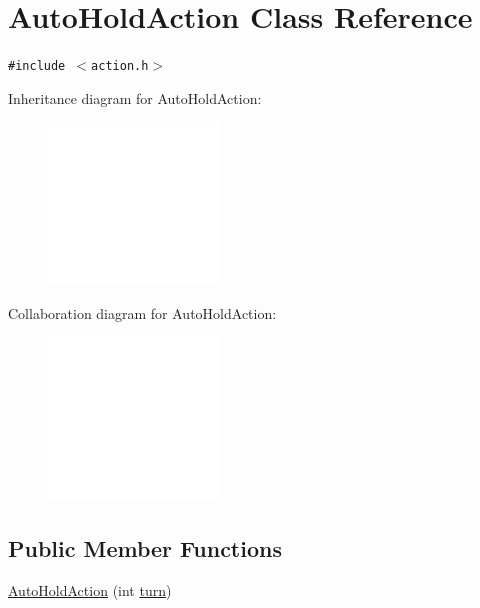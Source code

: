 \hypertarget{classAutoHoldAction}{
\section{AutoHoldAction Class Reference}
\label{classAutoHoldAction}
}
{\tt \#include $<$action.h$>$}

Inheritance diagram for AutoHoldAction:\nopagebreak
\begin{figure}[H]
\begin{center}
\leavevmode
\includegraphics[width=130pt]{classAutoHoldAction__inherit__graph}
\end{center}
\end{figure}
Collaboration diagram for AutoHoldAction:\nopagebreak
\begin{figure}[H]
\begin{center}
\leavevmode
\includegraphics[width=130pt]{classAutoHoldAction__coll__graph}
\end{center}
\end{figure}
\subsection*{Public Member Functions}
\begin{CompactItemize}
\item 
\hyperlink{classAutoHoldAction_cff55ae9d07cf4e3b86569b78ebc07cc}{AutoHoldAction} (int \hyperlink{classAction_51e5d56a6aa4a037e90df19587a225c7}{turn})
\end{CompactItemize}


